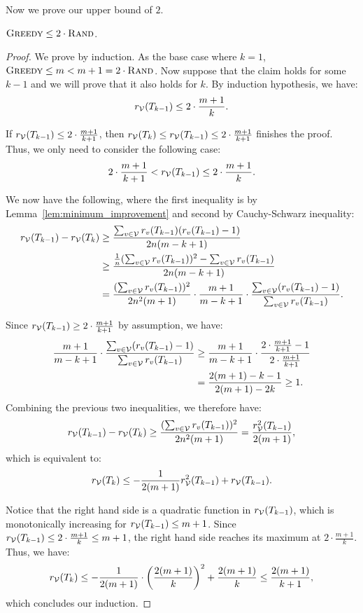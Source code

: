 Now we prove our upper bound of $2$.
\begin{theorem}
${\normalfont\textsc{Greedy}} \leq 2 \cdot {\normalfont\textsc{Rand}}$.
\label{thm:ub_greedy_1}
\end{theorem}
\begin{proof}
We prove by induction. As the base case where $k = 1$, ${\normalfont\textsc{Greedy}} \leq m < m + 1 =  2 \cdot {\normalfont\textsc{Rand}}$.
Now suppose that the claim holds for some $k - 1$ and we will prove that it also holds for $k$. By induction hypothesis, we have:
\[
r_{\mathcal{V}}(T_{k - 1}) \leq 2 \cdot \frac{m + 1}{k}.
\]

If $r_{\mathcal{V}}(T_{k - 1}) \leq 2 \cdot \frac{m + 1}{k + 1}$, then $r_{\mathcal{V}}(T_k) \leq r_{\mathcal{V}}(T_{k - 1}) \leq 2 \cdot \frac{m + 1}{k + 1}$ finishes the proof. Thus, we only need to consider the following case:
\[
2 \cdot \frac{m + 1}{k + 1} < r_{\mathcal{V}}(T_{k - 1}) \leq 2 \cdot \frac{m + 1}{k}.
\]

We now have the following, where the first inequality is by Lemma~\ref{lem:minimum_improvement} and second by Cauchy-Schwarz inequality:
\begin{align*}
r_{\mathcal{V}}(T_{k - 1}) - r_{\mathcal{V}}(T_k) &\geq \frac{\sum_{v \in \mathcal{V}} r_v(T_{k - 1})(r_v(T_{k - 1}) - 1)}{2n(m - k + 1)} \\
&\geq \frac{\frac{1}{n}(\sum_{v \in \mathcal{V}}r_v(T_{k - 1}))^2 - \sum_{v \in \mathcal{V}}r_v(T_{k - 1})}{2n(m - k + 1)} \\
&= \frac{(\sum_{v \in \mathcal{V}}r_v(T_{k - 1}))^2}{2n^2(m + 1)} \cdot \frac{m + 1}{m - k + 1} \cdot \frac{\sum_{v \in \mathcal{V}}(r_v(T_{k - 1}) - 1)}{\sum_{v \in \mathcal{V}}r_v(T_{k - 1})}.
\end{align*}

Since $r_{\mathcal{V}}(T_{k - 1}) \geq 2 \cdot \frac{m + 1}{k + 1}$ by assumption, we have:
\begin{align*}
\frac{m + 1}{m - k + 1} \cdot \frac{\sum_{v \in \mathcal{V}}(r_v(T_{k - 1}) - 1)}{\sum_{v \in \mathcal{V}}r_v(T_{k - 1})} &\geq \frac{m + 1}{m - k + 1} \cdot \frac{2 \cdot \frac{m + 1}{k + 1} - 1}{2 \cdot \frac{m + 1}{k + 1}}\\
&= \frac{2(m + 1) - k - 1}{2(m + 1) - 2k} \geq 1.
\end{align*}
Combining the previous two inequalities, we therefore have:
\[
r_{\mathcal{V}}(T_{k - 1}) - r_{\mathcal{V}}(T_k) \geq \frac{(\sum_{v \in \mathcal{V}}r_v(T_{k - 1}))^2}{2n^2(m + 1)} = \frac{r_{\mathcal{V}}^2(T_{k - 1})}{2(m + 1)},
\]
which is equivalent to:
\[
r_{\mathcal{V}}(T_k) \leq - \frac{1}{2(m + 1)} r_{\mathcal{V}}^2(T_{k - 1}) + r_{\mathcal{V}}(T_{k - 1}).
\]

Notice that the right hand side is a quadratic function in $r_{\mathcal{V}}(T_{k - 1})$, which is monotonically increasing for $r_{\mathcal{V}}(T_{k - 1}) \leq m + 1$. Since $r_{\mathcal{V}}(T_{k - 1}) \leq 2 \cdot \frac{m + 1}{k} \leq m + 1$, the right hand side reaches its maximum at $2 \cdot \frac{m + 1}{k}$. Thus, we have:
\[
r_{\mathcal{V}}(T_k) \leq - \frac{1}{2(m + 1)}\cdot \left(\frac{2(m + 1)}{k}\right)^2 + \frac{2(m + 1)}{k} \leq \frac{2(m + 1)}{k + 1},
\]
which concludes our induction.
\end{proof}

